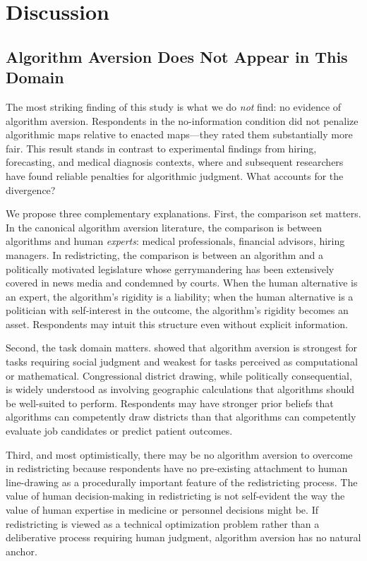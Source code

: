 \section{Discussion}
\label{sec:discussion}

\subsection{Algorithm Aversion Does Not Appear in This Domain}

The most striking finding of this study is what we do \textit{not} find: no evidence of algorithm aversion. Respondents in the no-information condition did not penalize algorithmic maps relative to enacted maps---they rated them substantially more fair. This result stands in contrast to experimental findings from hiring, forecasting, and medical diagnosis contexts, where \citet{dietvorst2015algorithm} and subsequent researchers have found reliable penalties for algorithmic judgment. What accounts for the divergence?

We propose three complementary explanations. First, the comparison set matters. In the canonical algorithm aversion literature, the comparison is between algorithms and human \textit{experts}: medical professionals, financial advisors, hiring managers. In redistricting, the comparison is between an algorithm and a politically motivated legislature whose gerrymandering has been extensively covered in news media and condemned by courts. When the human alternative is an expert, the algorithm's rigidity is a liability; when the human alternative is a politician with self-interest in the outcome, the algorithm's rigidity becomes an asset. Respondents may intuit this structure even without explicit information.

Second, the task domain matters. \citet{castelo2019task} showed that algorithm aversion is strongest for tasks requiring social judgment and weakest for tasks perceived as computational or mathematical. Congressional district drawing, while politically consequential, is widely understood as involving geographic calculations that algorithms should be well-suited to perform. Respondents may have stronger prior beliefs that algorithms can competently draw districts than that algorithms can competently evaluate job candidates or predict patient outcomes.

Third, and most optimistically, there may be no algorithm aversion to overcome in redistricting because respondents have no pre-existing attachment to human line-drawing as a procedurally important feature of the redistricting process. The value of human decision-making in redistricting is not self-evident the way the value of human expertise in medicine or personnel decisions might be. If redistricting is viewed as a technical optimization problem rather than a deliberative process requiring human judgment, algorithm aversion has no natural anchor.

